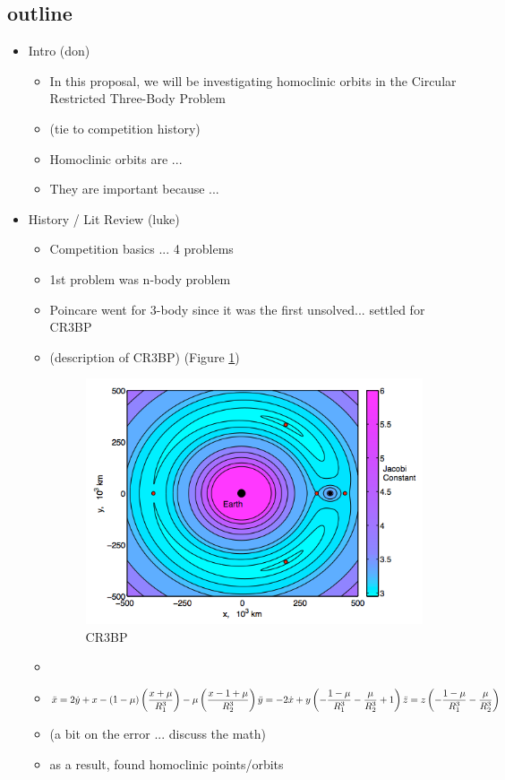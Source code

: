 \documentclass{article}
\begin{document}
\subsection{outline}
\begin{itemize}
	\item Intro (don)
	  \begin{itemize}
	  	\item In this proposal, we will be investigating homoclinic orbits in the Circular Restricted Three-Body Problem
	  	\item (tie to competition history)
	  	\item Homoclinic orbits are ... 
	  	\item They are important because ...
	  \end{itemize}
	\item History / Lit Review (luke)
	  \begin{itemize}
	  	\item Competition basics ... 4 problems
	  	\item 1st problem was n-body problem
	  	\item Poincare went for 3-body since it was the first unsolved... settled for CR3BP 
	  	\item (description of CR3BP) (Figure \ref{fig:CR3BP_EarthMoon})
			\begin{figure}
			\centering
			\includegraphics[scale=0.7]{CR3BP_EarthMoon.png}
			\caption{CR3BP}
			\label{fig:CR3BP_EarthMoon}
			\end{figure}
		\item
	  	\item $\ddot{x} =  2\dot{y} + x - (1-\mu)\left(\dfrac{x+\mu}{R_1^3}\right) - \mu\left(\dfrac{x-1+\mu}{R_2^3}\right)\\
		\ddot{y} = - 2\dot{x} + y\left(-\dfrac{1-\mu}{R_1^3} - \dfrac{\mu}{R_2^3} + 1\right) \\
		\ddot{z} = z\left(-\dfrac{1 - \mu}{R_1^3} - \dfrac{\mu}{R_2^3}\right)$
	  	\item (a bit on the error ... discuss the math)
	  	\item as a result, found homoclinic points/orbits


\end{itemize}
\end{itemize}
\end{document}
